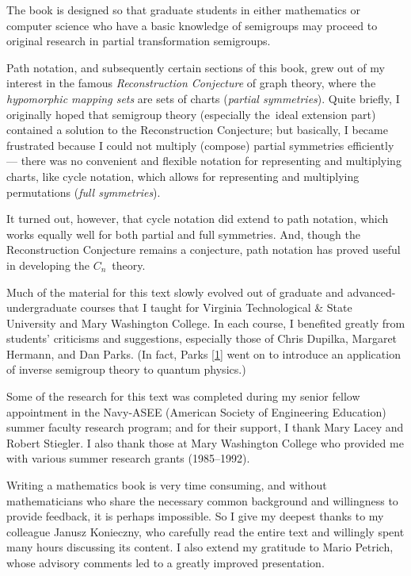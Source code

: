 \documentclass{surv-l}
\numberwithin{equation}{section}
\numberwithin{table}{section}
\numberwithin{figure}{section}
\theoremstyle{definition}
\begin{document}
The book is designed so that graduate students in either
mathematics or computer science who have a basic knowledge of
semigroups may proceed to original research in partial
transformation semigroups.

Path notation, and subsequently certain sections of this book,
grew out of my interest in the famous \emph{Reconstruction
Conjecture} of graph theory, where the \emph{hypomorphic mapping
sets} are sets of charts (\emph{partial
symmetries}). Quite briefly, I originally hoped that semigroup
theory (especially the~ideal extension part) contained a solution
to the Reconstruction Conjecture; but basically, I became
frustrated because I could not multiply (compose) partial
symmetries efficiently --- there was no convenient and flexible
notation for representing and multiplying charts, like cycle
notation, which allows for representing and multiplying
permutations (\emph{full symmetries}).

It turned out, however, that cycle notation did extend to path
notation, which works equally well for both partial and full
symmetries. And, though the Reconstruction Conjecture remains a
conjecture, path notation has proved useful in developing the
$C_{n}$~theory.

Much of the material for this text slowly evolved out of graduate
and advanced-undergraduate courses that I taught for Virginia
Technological \& State University and Mary Washington College. In
each course, I benefited greatly from students' criticisms and
suggestions, especially those of Chris Dupilka,
Margaret Hermann, and Dan Parks. (In fact, Parks
[\hyperlink{bib57}{1}] went on to introduce an
application of inverse semigroup theory to quantum physics.)

Some of the research for this text was completed during my senior
fellow appointment in the Navy-ASEE (American Society of
Engineering Education) summer faculty research program; and for
their support, I thank Mary Lacey and Robert
Stiegler. I also thank those at Mary
Washington College who provided me with various summer research
grants (1985--1992).

Writing a mathematics book is very time consuming, and without
mathematicians who share the necessary common background and
willingness to provide feedback, it is perhaps impossible. So I
give my deepest thanks to my colleague Janusz Konieczny, who
carefully read the entire text and willingly spent many hours
discussing its content. I also extend my gratitude to Mario
Petrich, whose advisory comments led to a greatly improved
presentation.
\end{document}
